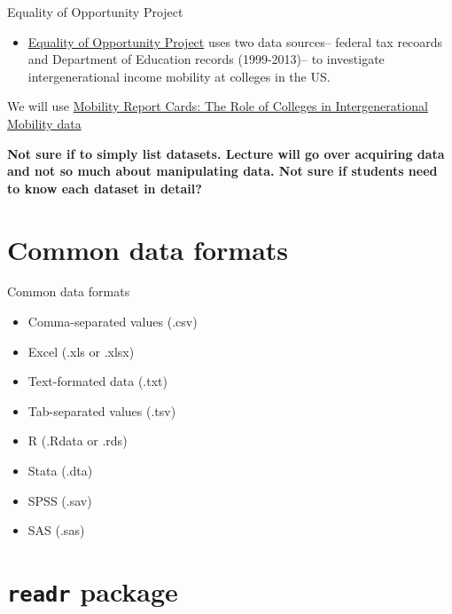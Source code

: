 \documentclass[8pt,ignorenonframetext,dvipsnames]{beamer}
\providecommand{\tightlist}{%
  \setlength{\itemsep}{0pt}\setlength{\parskip}{0pt}}
\renewcommand{\textbf}[1]{{\color{darkgray}\bfseries\fontfamily{Montserrat-TOsF}#1}}
\begin{document}
\begin{frame}{Equality of Opportunity Project}

\begin{itemize}
\tightlist
\item
  \href{http://www.equality-of-opportunity.org/papers/coll_mrc_paper.pdf}{Equality
  of Opportunity Project} uses two data sources-- federal tax recoards
  and Department of Education records (1999-2013)-- to investigate
  intergenerational income mobility at colleges in the US.
\end{itemize}

We will use
\href{http://www.equality-of-opportunity.org/documents/}{Mobility Report
Cards: The Role of Colleges in Intergenerational Mobility data}

\textbf{Not sure if to simply list datasets. Lecture will go over
acquiring data and not so much about manipulating data. Not sure if
students need to know each dataset in detail?}

\end{frame}

\section{Common data formats}\label{common-data-formats}

\begin{frame}{Common data formats}

\begin{itemize}
\tightlist
\item
  Comma-separated values (.csv)\\
\item
  Excel (.xls or .xlsx)\\
\item
  Text-formated data (.txt)\\
\item
  Tab-separated values (.tsv)
\item
  R (.Rdata or .rds)\\
\item
  Stata (.dta)
\item
  SPSS (.sav)\\
\item
  SAS (.sas)
\end{itemize}

\end{frame}

\section{\texorpdfstring{\texttt{readr}
package}{readr package}}\label{readr-package}
\end{document}
